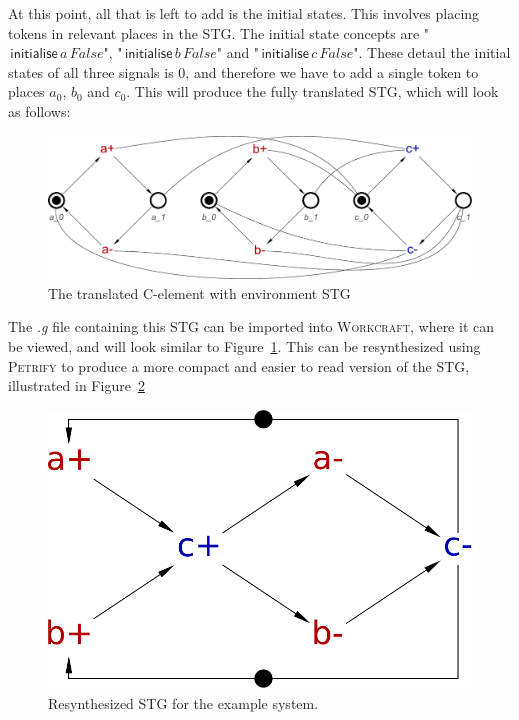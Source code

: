 \documentclass[british,compsoc]{IEEEtran}
\newcommand{\noun}[1]{\textsc{#1}}
\begin{document}
At this point, all that is left to add is the initial states. This involves placing tokens in relevant places in the STG. The initial state concepts are "$\,\mathsf{initialise}\,a \,False$",
"$\,\mathsf{initialise}\,b \,False$" and "$\,\mathsf{initialise}\,c \,False$". These detaul the initial states of all three signals is 0, and therefore we have to add a single token to places $a_0$,
$b_0$ and $c_0$. This will produce the fully translated STG, which will look as follows:

\begin{figure}[h]
\begin{centering}
\includegraphics[scale=0.23]{Images/Step-by-step12}
\par\end{centering}

\begin{centering}
\protect\caption{\label{fig:step-by-step12}The translated C-element with environment STG}

\par\end{centering}

\end{figure}

The \emph{.g} file containing this STG can be imported into \noun{Workcraft}, where it can be viewed, and will look similar to Figure~\ref{fig:step-by-step12}. This can be
resynthesized using \noun{Petrify} to produce a more compact and easier to read version of the STG, illustrated in Figure~\ref{fig:cElement STG}

\begin{figure}[h]
\begin{centering}
\includegraphics[scale=0.28]{Images/stg-cElement}
\par\end{centering}

\protect\caption{\label{fig:cElement STG}Resynthesized STG for the example system.}
\end{figure}
\end{document}
